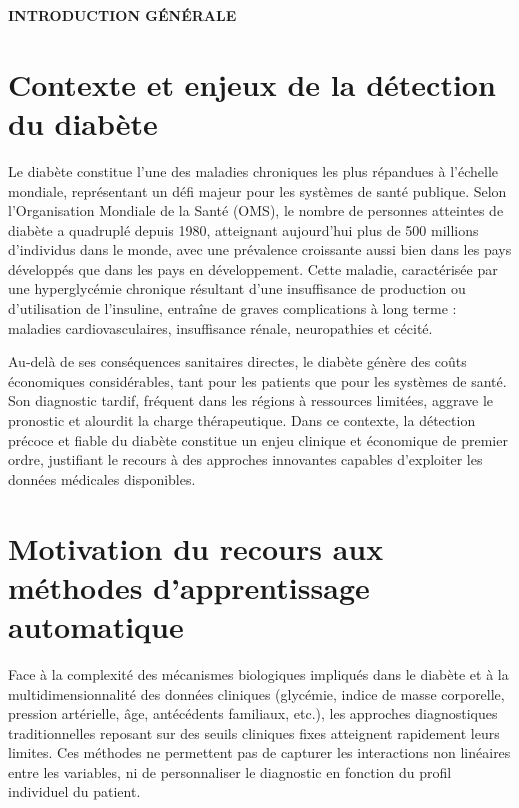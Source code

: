 \newpage
\vspace*{7cm}
\begin{center}
  {\Huge\bfseries INTRODUCTION GÉNÉRALE}
\end{center}
\vspace*{\fill}

\newpage
\section*{Contexte et enjeux de la détection du diabète}

Le diabète constitue l'une des maladies chroniques les plus répandues à l'échelle
mondiale, représentant un défi majeur pour les systèmes de santé publique. Selon
l'Organisation Mondiale de la Santé (OMS), le nombre de personnes atteintes de diabète
a quadruplé depuis 1980, atteignant aujourd'hui plus de 500 millions d'individus dans
le monde, avec une prévalence croissante aussi bien dans les pays développés que dans
les pays en développement. Cette maladie, caractérisée par une hyperglycémie chronique
résultant d'une insuffisance de production ou d'utilisation de l'insuline, entraîne de graves
complications à long terme : maladies cardiovasculaires, insuffisance rénale, neuropathies
et cécité.

Au-delà de ses conséquences sanitaires directes, le diabète génère des coûts économiques
considérables, tant pour les patients que pour les systèmes de santé. Son diagnostic tardif,
fréquent dans les régions à ressources limitées, aggrave le pronostic et alourdit la charge
thérapeutique. Dans ce contexte, la détection précoce et fiable du diabète constitue un
enjeu clinique et économique de premier ordre, justifiant le recours à des approches
innovantes capables d'exploiter les données médicales disponibles.

\section*{Motivation du recours aux méthodes d'apprentissage automatique}

Face à la complexité des mécanismes biologiques impliqués dans le diabète et à la
multidimensionnalité des données cliniques (glycémie, indice de masse corporelle, pression
artérielle, âge, antécédents familiaux, etc.), les approches diagnostiques traditionnelles
reposant sur des seuils cliniques fixes atteignent rapidement leurs limites. Ces méthodes
ne permettent pas de capturer les interactions non linéaires entre les variables, ni de
personnaliser le diagnostic en fonction du profil individuel du patient.


